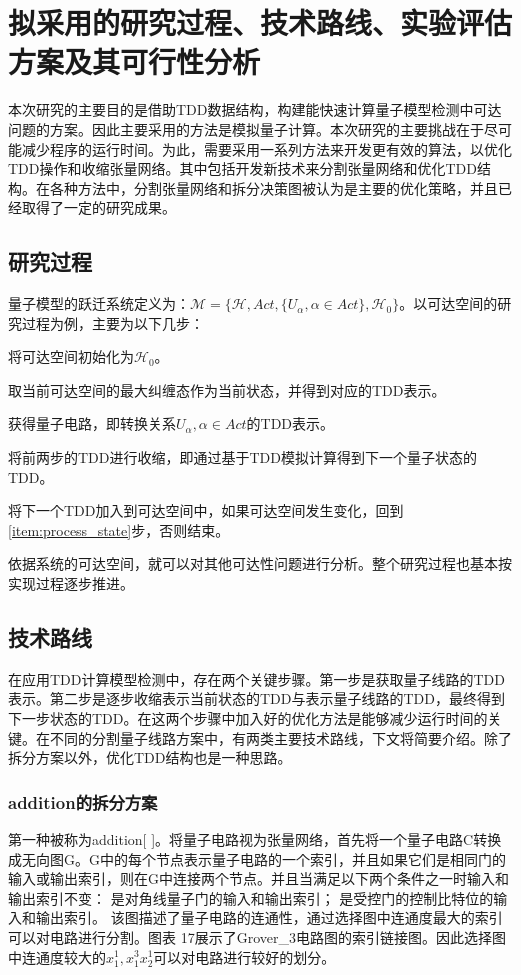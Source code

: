 \section{拟采用的研究过程、技术路线、实验评估方案及其可行性分析}
本次研究的主要目的是借助TDD数据结构，构建能快速计算量子模型检测中可达问题的方案。因此主要采用的方法是模拟量子计算。本次研究的主要挑战在于尽可能减少程序的运行时间。为此，需要采用一系列方法来开发更有效的算法，以优化TDD操作和收缩张量网络。其中包括开发新技术来分割张量网络和优化TDD结构。在各种方法中，分割张量网络和拆分决策图被认为是主要的优化策略，并且已经取得了一定的研究成果。
\subsection{研究过程}
量子模型的跃迁系统定义为：$\mathcal{M}=\{\mathcal{H},Act,\{U_\alpha,\alpha\in Act\},\mathcal{H}_0\}$。以可达空间的研究过程为例，主要为以下几步：
\begin{myen}
	\item \label{item:process_inital}将可达空间初始化为$\mathcal{H}_0$。
	\item \label{item:process_state}取当前可达空间的最大纠缠态作为当前状态，并得到对应的TDD表示。
	\item \label{item:process_cir}获得量子电路，即转换关系$U_\alpha,\alpha\in Act$的TDD表示。
	\item \label{item:process_cont} 将前两步的TDD进行收缩，即通过基于TDD模拟计算得到下一个量子状态的TDD。
	\item \label{item:process_end}将下一个TDD加入到可达空间中，如果可达空间发生变化，回到\ref{item:process_state}步，否则结束。
\end{myen}
	
依据系统的可达空间，就可以对其他可达性问题进行分析。整个研究过程也基本按实现过程逐步推进。
\subsection{技术路线}
在应用TDD计算模型检测中，存在两个关键步骤。第一步是获取量子线路的TDD表示。第二步是逐步收缩表示当前状态的TDD与表示量子线路的TDD，最终得到下一步状态的TDD。在这两个步骤中加入好的优化方法是能够减少运行时间的关键。在不同的分割量子线路方案中，有两类主要技术路线，下文将简要介绍。除了拆分方案以外，优化TDD结构也是一种思路。
\subsubsection{addition的拆分方案}
第一种被称为addition[ ]。将量子电路视为张量网络，首先将一个量子电路C转换成无向图G。G中的每个节点表示量子电路的一个索引，并且如果它们是相同门的输入或输出索引，则在G中连接两个节点。并且当满足以下两个条件之一时输入和输出索引不变：
	是对角线量子门的输入和输出索引；
	是受控门的控制比特位的输入和输出索引。
该图描述了量子电路的连通性，通过选择图中连通度最大的索引可以对电路进行分割。图表 17展示了Grover\_3电路图的索引链接图。因此选择图中连通度较大的$x_1^1,x_1^3x_2^1$可以对电路进行较好的划分。
 
